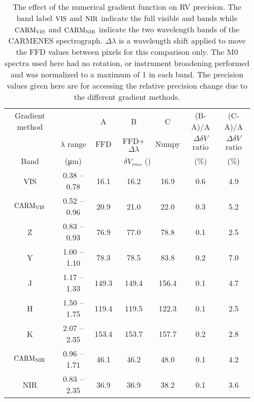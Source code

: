 
\begin{table}
    \centering
    \caption[Effect of numerial gradient.]{The effect of the numerical gradient function on {RV} precision.
        The band label \(\rm VIS\) and \(\rm NIR\) indicate the full visible and \nir{} bands while  \(\rm CARM_{VIS}\)  and \(\rm CARM_{NIR}\)  indicate the two wavelength bands of the {CARMENES} spectrograph.
        \(\Delta\lambda\) is a wavelength shift applied to move the FFD values between pixels for this comparison only. 
        The M0 spectra used here had no rotation, or instrument broadening performed and was normalized to a maximum of 1 in each band.
        The precision values given here are for accessing the relative precision change due to the different gradient methods.}
    \begin{tabular}{ccccccc}
        \toprule
        Gradient method &  &  A &   B & C & (B-A)/A & (C-A)/A \\
        &   \(\lambda\) range & FFD & FFD+\(\Delta\lambda\) &  Numpy & \(\Delta\delta V\) ratio& \(\Delta\delta V\) ratio\\

        Band  & (\si{\micro\meter})  & \multicolumn{3}{c}{\(\delta V_{rms}\) (\mps{})}  & (\%) & (\%) \\
        \midrule
        VIS & 0.38 -- 0.78 & 16.1 & 16.2 & 16.9  & 0.6 & 4.9\\
        \(\rm CARM_{VIS}\) & 0.52 --  0.96 & 20.9 & 21.0 & 22.0 & 0.3 & 5.2 \\
        Z & 0.83 -- 0.93 & 76.9 & 77.0 & 78.8  & 0.1 & 2.5\\
        Y & 1.00 -- 1.10 & 78.3 & 78.5 & 83.8 & 0.2 & 7.0 \\
        J & 1.17 -- 1.33 & 149.3 & 149.4 & 156.4 & 0.1 & 4.7 \\
        H & 1.50 -- 1.75 & 119.4 & 119.5 & 122.3 & 0.1 & 2.5 \\
        K & 2.07 -- 2.35 & 153.4 & 153.7 & 157.7  & 0.2 & 2.8\\
        \(\rm CARM_{NIR}\) & 0.96 -- 1.71 & 46.1 & 46.2 & 48.0 & 0.1 & 4.2 \\
        NIR & 0.83 -- 2.35 & 36.9 & 36.9 & 38.2 & 0.1 & 3.6  \\
        \bottomrule
    \end{tabular}\label{tab:numerical_gradients}
\end{table}
